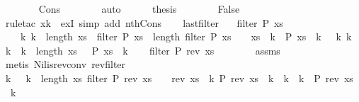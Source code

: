 \begin{isabellebody}
\ \ \ \ \ \ \isamarkupfalse%
\ Cons\isanewline
\ \ \ \ \ \ \isamarkupfalse%
\ auto\isanewline
\ \ \ \ \isamarkupfalse%
\ {\isacharquery}thesis\isanewline
\ \ \ \ \ \ \isamarkupfalse%
\ False\isanewline
\ \ \ \ \ \ \isamarkupfalse%
\ {\isacharparenleft}rule{\isacharunderscore}tac\ x{\isacharequal}{\isachardoublequoteopen}k{\isacharplus}{}{\isachardoublequoteclose}\ \ exI{\isacharcomma}\ simp\ add{\isacharcolon}\ nth{\isacharunderscore}Cons{\isacharprime}{\isacharparenright}\isanewline
\ \ \isamarkupfalse%
\isanewline
{}\isamarkupfalse%
%
\endisatagproof
{\isafoldproof}%
%
\isadelimproof
\isanewline
%
\endisadelimproof
\isanewline
{}\isamarkupfalse%
\ last{\isacharunderscore}filter{\isacharcolon}\isanewline
\ \ \ {\isachardoublequoteopen}filter\ P\ xs\ {\isasymnoteq}\ {\isacharbrackleft}{\isacharbrackright}{\isachardoublequoteclose}\isanewline
\ \ \ {\isachardoublequoteopen}{\isasymexists}\ k{\isachardot}\ k\ {\isacharless}\ length\ xs\ {\isasymand}\ {\isacharparenleft}filter\ P\ xs{\isacharparenright}\ {\isacharbang}\ {\isacharparenleft}length\ {\isacharparenleft}filter\ P\ xs{\isacharparenright}\ {\isacharminus}\ {}{\isacharparenright}\ {\isacharequal}\ xs\ {\isacharbang}\ k\ {\isasymand}\ P\ {\isacharparenleft}xs\ {\isacharbang}\ k{\isacharparenright}\ {\isasymand}\ {\isacharparenleft}{\isasymforall}\ k{\isacharprime}{\isachardot}\ k\ {\isacharless}\ k{\isacharprime}\ {\isasymand}\ k{\isacharprime}\ {\isacharless}\ length\ xs\ {\isasymlongrightarrow}\ {\isasymnot}\ P\ {\isacharparenleft}xs\ {\isacharbang}\ k{\isacharprime}{\isacharparenright}{\isacharparenright}{\isachardoublequoteclose}\isanewline
%
\isadelimproof
%
\endisadelimproof
%
\isatagproof
{}\isamarkupfalse%
{\isacharminus}\isanewline
\ \ \isamarkupfalse%
\ {\isachardoublequoteopen}filter\ P\ {\isacharparenleft}rev\ xs{\isacharparenright}\ {\isasymnoteq}\ {\isacharbrackleft}{\isacharbrackright}{\isachardoublequoteclose}\isanewline
\ \ \ \ \isamarkupfalse%
\ assms\isanewline
\ \ \ \ \isamarkupfalse%
\ {\isacharparenleft}metis\ Nil{\isacharunderscore}is{\isacharunderscore}rev{\isacharunderscore}conv\ rev{\isacharunderscore}filter{\isacharparenright}\isanewline
\ \ \isamarkupfalse%
\ \isamarkupfalse%
\ k\ \ {\isacharasterisk}{\isacharcolon}\ {\isachardoublequoteopen}k\ {\isacharless}\ length\ xs{\isachardoublequoteclose}\ {\isachardoublequoteopen}filter\ P\ {\isacharparenleft}rev\ xs{\isacharparenright}\ {\isacharbang}\ {}\ {\isacharequal}\ rev\ xs\ {\isacharbang}\ k{\isachardoublequoteclose}\ {\isachardoublequoteopen}P\ {\isacharparenleft}rev\ xs\ {\isacharbang}\ k{\isacharparenright}{\isachardoublequoteclose}\ {\isachardoublequoteopen}{\isasymforall}\ k{\isacharprime}\ {\isacharless}\ k{\isachardot}\ {\isasymnot}\ P\ {\isacharparenleft}rev\ xs\ {\isacharbang}\ k{\isacharprime}{\isacharparenright}{\isachardoublequoteclose}\isanewline

\end{isabellebody}
